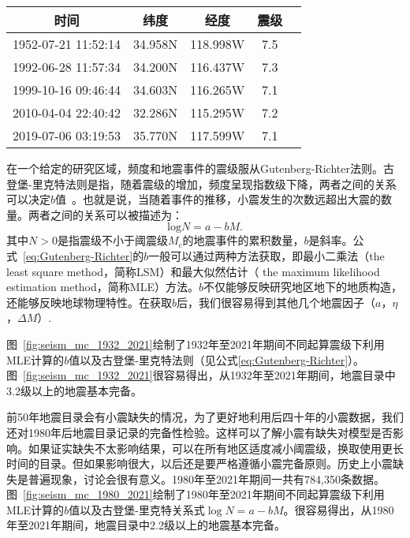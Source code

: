 \begin{table}[!htbp]
    \label{tab:seism_magnitude_7}
    \centering
    \footnotesize
    \setlength{\tabcolsep}{5.2pt}
    \renewcommand{\arraystretch}{1}
    \begin{tabular}{ccccc} 
        \toprule
        时间 & 纬度 & 经度 & 震级 \\
        \midrule
        1952-07-21 11:52:14 & 34.958N & 118.998W & 7.5 \\
        1992-06-28 11:57:34 & 34.200N & 116.437W & 7.3 \\
        1999-10-16 09:46:44 & 34.603N & 116.265W & 7.1 \\
        2010-04-04 22:40:42 & 32.286N & 115.295W & 7.2 \\
        2019-07-06 03:19:53 & 35.770N & 117.599W & 7.1 \\
        \bottomrule
    \end{tabular}
\end{table}

在一个给定的研究区域，频度和地震事件的震级服从Gutenberg-Richter法则\citep{Gutenberg1994Frequency,Panakkat2007Neural}。古登堡-里克特法则是指，随着震级的增加，频度呈现指数级下降，两者之间的关系可以决定$b$值~\citep{Asim2018Earthquake}。也就是说，当随着事件的推移，小震发生的次数远超出大震的数量。两者之间的关系可以被描述为：
\begin{equation}\label{eq:Gutenberg-Richter}
\mathrm{log}N=a-bM.
\end{equation}
其中$N>0$是指震级不小于阈震级$M_c$的地震事件的累积数量，$b$是斜率。公式~\eqref{eq:Gutenberg-Richter}的$b$一般可以通过两种方法获取，即最小二乘法（the least square method，简称LSM）和最大似然估计（ the maximum likelihood estimation method，简称MLE）方法。$b$不仅能够反映研究地区地下的地质构造，还能够反映地球物理特性。在获取$b$后，我们很容易得到其他几个地震因子（$a$，$\eta$，$\Delta M$）.

图~\ref{fig:seism_mc_1932_2021}绘制了1932年至2021年期间不同起算震级下利用MLE计算的$b$值以及古登堡-里克特法则（见公式\eqref{eq:Gutenberg-Richter}）。图~\ref{fig:seism_mc_1932_2021}很容易得出，从1932年至2021年期间，地震目录中3.2级以上的地震基本完备。

前50年地震目录会有小震缺失的情况，为了更好地利用后四十年的小震数据，我们还对1980年后地震目录记录的完备性检验。这样可以了解小震有缺失对模型是否影响。如果证实缺失不太影响结果，可以在所有地区适度减小阈震级，换取使用更长时间的目录。但如果影响很大，以后还是要严格遵循小震完备原则。历史上小震缺失是普遍现象，讨论会很有意义。1980年至2021年期间一共有784,350条数据。图~\ref{fig:seism_mc_1980_2021}绘制了1980年至2021年期间不同起算震级下利用MLE计算的$b$值以及古登堡-里克特关系式$\log N=a-bM$。很容易得出，从1980年至2021年期间，地震目录中2.2级以上的地震基本完备。


